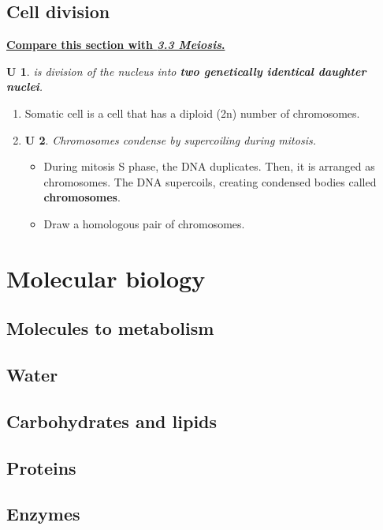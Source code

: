 \documentclass[12pt, a4paper]{article}
\newtheorem{und}{U}[subsection]
\begin{document}
\subsection{Cell division}\label{A}
\hyperref[B]{\textbf{Compare this section with \textit{3.3 Meiosis}.}}
\begin{und}
    \textbf{\color{red}{Mitosis}} is division of the nucleus into \textbf{two genetically identical daughter nuclei}. 
\end{und}
\begin{enumerate}
    \item Somatic cell is a cell that has a diploid (2n) number of chromosomes. 
    \item \begin{und} Chromosomes condense by supercoiling during mitosis. \end{und}
    \begin{itemize}
        \item During mitosis S phase, the DNA duplicates. Then, it is arranged as chromosomes. The DNA supercoils, creating condensed bodies called \textbf{chromosomes}.
        \item Draw a homologous pair of chromosomes.
    \end{itemize}
\end{enumerate}

\newpage
\section{Molecular biology}
\subsection{Molecules to metabolism}

\subsection{Water}

\subsection{Carbohydrates and lipids}

\subsection{Proteins}

\subsection{Enzymes}
\end{document}
